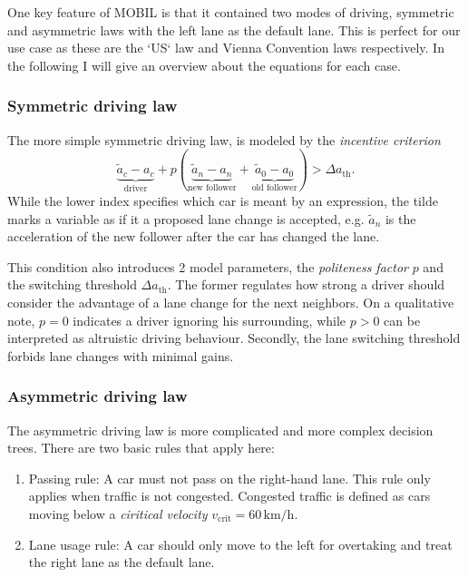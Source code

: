 One key feature of MOBIL is that it contained two modes of driving, symmetric and asymmetric laws with the left
lane as the default lane. This is perfect for our use case as these are the `US` law and Vienna Convention laws
respectively. In the following I will give an overview about the equations for each case.

\subsubsection{Symmetric driving law}
The more simple symmetric driving law, is modeled by the \textit{incentive criterion}
\begin{equation}
  \underbrace{\tilde{a}_c - a_c}_\text{driver}
  + p (
  \underbrace{\tilde{a}_n - a_n}_\text{new follower}
  +
  \underbrace{\tilde{a}_0 - a_0}_\text{old follower}
  )
  > \Delta a_\text{th}.
  \label{eqn:US_incentive}
\end{equation}
While the lower index specifies which car is meant by an expression, the tilde marks a variable as if it a proposed
lane change is accepted, e.g. $\tilde{a}_n$ is the acceleration of the new follower after the car has changed the
lane.

This condition also introduces 2 model parameters, the \textit{politeness factor} $p$ and the switching threshold
$\Delta a_\text{th}$. The former regulates how strong a driver should consider the advantage of a lane change for
the next neighbors. On a qualitative note, $p=0$ indicates a driver ignoring his surrounding, while $p>0$ can be
interpreted as altruistic driving behaviour. Secondly, the lane switching threshold forbids lane changes with
minimal gains.

\subsubsection{Asymmetric driving law}
The asymmetric driving law is more complicated and more complex decision trees. There are two basic rules that
apply here:
\begin{enumerate}
  \item Passing rule: A car must not pass on the right-hand lane. This rule only applies when traffic is not
    congested. Congested traffic is defined as cars moving below a \textit{ciritical velocity} 
    $v_\text{crit} = 60 \,
    \text{km/h}$.
  \item Lane usage rule: A car should only move to the left for overtaking and treat the right lane as the default
    lane.
\end{enumerate}

